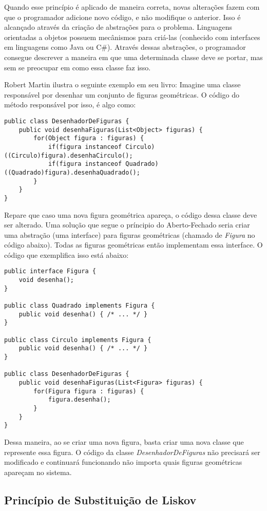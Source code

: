 Quando esse princípio é aplicado de maneira correta, novas alterações fazem com
que o programador adicione novo código, e não modifique o anterior. Isso é
alcançado através da criação de abstrações para o problema. Linguagens
orientadas a objetos possuem mecânismos para criá-las (conhecido com interfaces
em linguagens como Java ou C\#). Através dessas abstrações, o programador consegue 
descrever a maneira em que uma determinada classe deve se portar, mas sem se
preocupar em como essa classe faz isso.

Robert Martin \cite{bob-martin} ilustra o seguinte exemplo em seu livro: Imagine
uma classe responsável por desenhar um conjunto de figuras geométricas. O código
do método responsável por isso, é algo como:

\begin{lstlisting}[frame=trbl]
public class DesenhadorDeFiguras {
	public void desenhaFiguras(List<Object> figuras) {
		for(Object figura : figuras) {
			if(figura instanceof Circulo) ((Circulo)figura).desenhaCirculo();
			if(figura instanceof Quadrado) ((Quadrado)figura).desenhaQuadrado();
		}
	}
}
\end{lstlisting}

Repare que caso uma nova figura geométrica apareça, o código dessa classe deve
ser  alterado. Uma solução que segue o príncipio do Aberto-Fechado seria criar 
uma abstração (uma interface) para figuras geométricas (chamado de
\textit{Figura} no código abaixo). Todas as figuras geométricas então
implementam essa interface. O código que exemplifica isso está abaixo:

\begin{lstlisting}[frame=trbl]
public interface Figura {
	void desenha();
}

public class Quadrado implements Figura {
	public void desenha() { /* ... */ }
}

public class Circulo implements Figura {
	public void desenha() { /* ... */ }
}

public class DesenhadorDeFiguras {
	public void desenhaFiguras(List<Figura> figuras) {
		for(Figura figura : figuras) {
			figura.desenha();
		}
	}
}
\end{lstlisting}

Dessa maneira, ao se criar uma nova figura, basta criar uma nova classe que
represente essa figura. O código da classe \textit{DesenhadorDeFiguras} não
precisará ser modificado e continuará funcionando não importa quais figuras
geométricas apareçam no sistema.

\subsection{Princípio de Substituição de Liskov}
\label{subsec:lsp}

